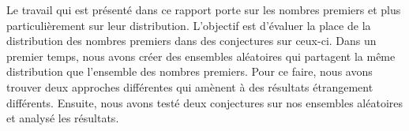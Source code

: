 \documentclass[../main.tex]{subfile}
\begin{document}
Le travail qui est présenté dans ce rapport porte sur les nombres premiers et plus particulièrement sur leur distribution. L'objectif est d'évaluer la place de la distribution des nombres premiers dans des conjectures sur ceux-ci. Dans un premier temps, nous avons créer des ensembles aléatoires qui partagent la même distribution que l'ensemble des nombres premiers. Pour ce faire, nous avons trouver deux approches différentes qui amènent à des résultats étrangement différents. Ensuite, nous avons testé deux conjectures sur nos ensembles aléatoires et analysé les résultats.
\clearpage
\end{document}
